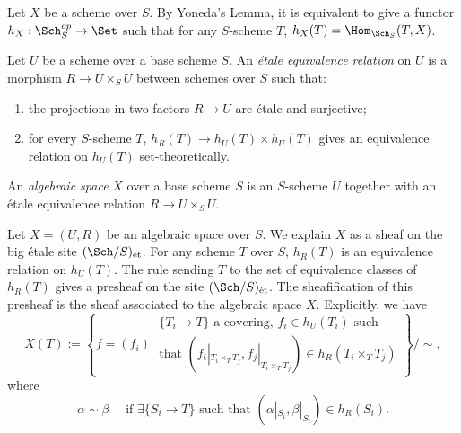     Let \(X\) be a scheme over \(S\).
    By Yoneda's Lemma, it is equivalent to give a functor \(h_X: \Sch_S^{op} \to \Set\) such that for any \(S\)-scheme \(T\), \(h_X(T) = \Hom_{\Sch_S}(T, X)\).

    \begin{definition}\label{def:etale_equivalent_relation}
        Let \(U\) be a scheme over a base scheme \(S\).
        An \emph{\'etale equivalence relation} on \(U\) is a morphism \(R \to U \times_S U\) between schemes over \(S\) such that:
        \begin{enumerate}
            \item the projections in two factors \(R \to U\) are \'etale and surjective;
            \item for every \(S\)-scheme \(T\), \(h_R(T) \to h_U(T) \times h_U(T)\) gives an equivalence relation on \(h_U(T)\) set-theoretically.
        \end{enumerate}
    \end{definition}

    \begin{definition}\label{def:algebraic_space_as_topological_space}
        An \emph{algebraic space} \(X\) over a base scheme \(S\) is an \(S\)-scheme \(U\) together with an \'etale equivalence relation \(R \to U \times_S U\).
    \end{definition}

    Let \(X = (U,R)\) be an algebraic space over \(S\).
    We explain \(X\) as a sheaf on the big \'etale site \((\Sch/S)_{\text{\'et}}\).
    For any scheme \(T\) over \(S\), \(h_R(T)\) is an equivalence relation on \(h_U(T)\).
    The rule sending \(T\) to the set of equivalence classes of \(h_R(T)\) gives a presheaf on the site \((\Sch/S)_{\text{\'et}}\).
    The sheafification of this presheaf is the sheaf associated to the algebraic space \(X\).
    Explicitly, we have
    \[ X(T) := \left\{ f = (f_i) \Bigg| \begin{array}{c}
        \{T_i\to T\} \text{ a covering, } f_i \in h_U(T_i) \text{ such}  \\
        \text{that } (f_i|_{T_i\times_T T_j},f_j|_{T_i\times_T T_j}) \in h_R(T_i \times_T T_j)
    \end{array}     \right\}\Bigg/ \sim, \]
    where 
    \[ \alpha \sim \beta \quad \text{ if } \exists \{S_i \to T\} \text{ such that } (\alpha|_{S_i},\beta|_{S_i}) \in h_R(S_i). \]
    
